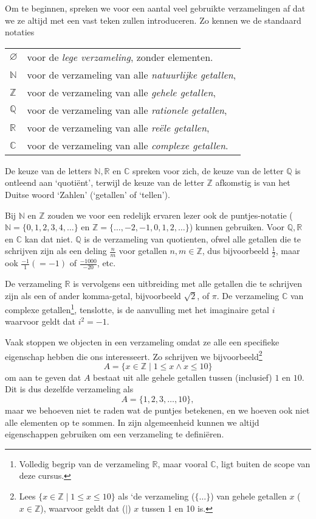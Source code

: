 Om te beginnen, spreken we voor een aantal veel gebruikte verzamelingen af dat we ze altijd met een vast teken zullen introduceren. Zo kennen we de standaard notaties
\begin{center}
    \begin{tabular}{ll}
    $\varnothing$ & voor de \textit{lege verzameling}, zonder elementen.\\
    $\mathbb{N}$ & voor de verzameling van alle \textit{natuurlijke getallen},\\
    $\mathbb{Z}$ & voor de verzameling van alle \textit{gehele getallen},\\
    $\mathbb{Q}$ & voor de verzameling van alle \textit{rationele getallen},\\
    $\mathbb{R}$ & voor de verzameling van alle \textit{re\"ele getallen},\\
    $\mathbb{C}$ & voor de verzameling van alle \textit{complexe getallen}.
    \end{tabular}
\end{center}
De keuze van de letters $\mathbb{N}, \mathbb{R}$ en $\mathbb{C}$ spreken voor zich, de keuze van de letter $\mathbb{Q}$ is ontleend aan `quoti\"ent', terwijl de keuze van de letter $\mathbb{Z}$ afkomstig is van het Duitse woord `Zahlen' (`getallen' of `tellen').

Bij $\mathbb{N}$ en $\mathbb{Z}$ zouden we voor een redelijk ervaren lezer ook de puntjes-notatie ($\mathbb{N}=\{0,1,2,3,4,\ldots\}$ en $\mathbb{Z}=\{\ldots,-2,-1,0,1,2,\ldots\}$) kunnen gebruiken. Voor $\mathbb{Q}, \mathbb{R}$ en $\mathbb{C}$ kan dat niet. $\mathbb{Q}$ is de verzameling van quotienten, ofwel alle getallen die te schrijven zijn als een deling $\frac{n}{m}$ voor getallen $n,m\in\mathbb{Z}$, dus bijvoorbeeld $\frac{1}{2}$, maar ook $\frac{-1}{1} (=-1)$ of $\frac{-1000}{-20}$, etc.

De verzameling $\mathbb{R}$ is vervolgens een uitbreiding met alle getallen die te schrijven zijn als een of ander komma-getal, bijvoorbeeld $\sqrt{2}$, %
of $\pi$. De verzameling $\mathbb{C}$ van complexe getallen\footnote{Volledig begrip van de verzameling $\mathbb{R}$, maar vooral $\mathbb{C}$, ligt buiten de scope van deze cursus.}, tenslotte, is de aanvulling met het imaginaire getal $i$ waarvoor geldt dat $i^2=-1$.

Vaak stoppen we objecten in een verzameling omdat ze alle een specifieke eigenschap hebben die ons interesseert. Zo schrijven we bijvoorbeeld\footnote{Lees $\{x\in\mathbb{Z}\;|\;1\leq x\leq 10\}$ als `de verzameling ($\{\ldots\}$) van gehele getallen $x$ ($x\in\mathbb{Z}$), waarvoor geldt dat ($|$) $x$ tussen 1 en 10 is.}
$$A=\{x\in\mathbb{Z}\;|\;1\leq x\land x\leq 10\}$$
om aan te geven dat $A$ bestaat uit alle gehele getallen tussen (inclusief) $1$ en $10$. Dit is dus dezelfde verzameling als
$$A=\{1,2,3,\ldots,10\},$$
maar we behoeven niet te raden wat de puntjes betekenen, en we hoeven ook niet alle elementen op te sommen. In zijn algemeenheid kunnen we altijd eigenschappen gebruiken om een verzameling te defini\"eren. 

